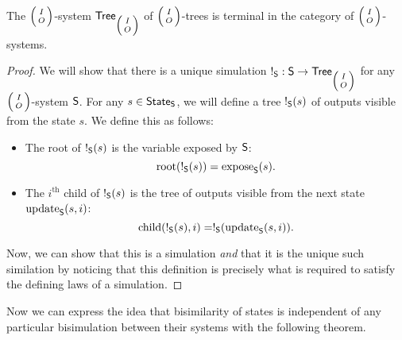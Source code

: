 \documentclass[DynamicalBook]{subfiles}
\begin{document}
\begin{proposition}
  The $\lens{I}{O}$-system $\Sys{Tree}_{\lens{I}{O}}$ of $\lens{I}{O}$-trees is
  terminal in the category of $\lens{I}{O}$-systems.
\end{proposition}
\begin{proof}
 We will show that there is a unique simulation $!_{\Sys{S}} : \Sys{S} \to
 \Sys{Tree}_{\lens{I}{O}}$ for any $\lens{I}{O}$-system $\mathsf{S}$.
 For any $s \in \mathsf{State}_{\mathsf{S}}$, we will define a tree $!_{\mathsf{S}}(s)$ of outputs
 visible from the state $s$. We define this as
 follows:
 \begin{itemize}
   \item The root of $!_{\mathsf{S}}(s)$ is the variable exposed by $\mathsf{S}$: \[\mathrm{root}(!_{\mathsf{S}}(s)) = \mathrm{expose}_{\mathsf{S}}(s).\]
   \item The $i^{\text{th}}$ child of $!_{\mathsf{S}}(s)$ is the tree of outputs
     visible from the next state $\mathrm{update}_{\mathsf{S}}(s, i)$: \[\mathrm{child}(!_{\mathsf{S}}(s), i) = !_{\mathsf{S}}(\mathrm{update}_{\mathsf{S}}(s, i)).\]
 \end{itemize}
 Now, we can show that this is a simulation \emph{and} that it is the unique
 such similation by noticing that this definition is precisely what is required
 to satisfy the defining laws of a simulation.
\end{proof}

Now we can express the idea that bisimilarity of states is independent of any
particular bisimulation between their systems with the following theorem.
\end{document}
